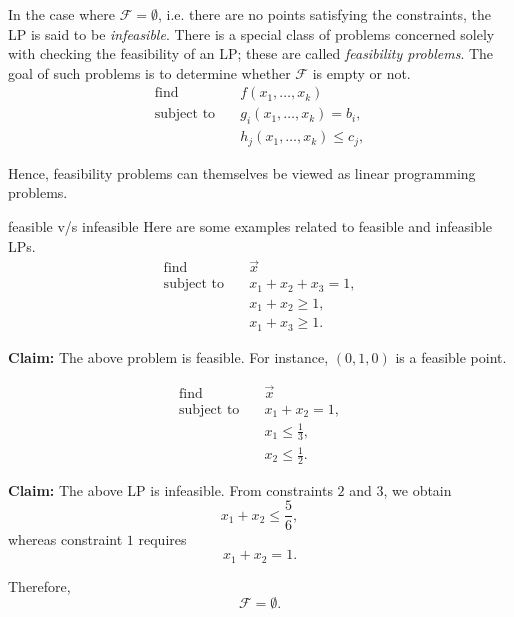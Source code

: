 In the case where $\mathcal{F} = \emptyset$, i.e. there are no points satisfying the constraints, the LP is said to be \textit{infeasible}.
There is a special class of problems concerned solely with checking the feasibility of an LP; these are called \textit{feasibility problems}. The goal of such problems is to determine whether $\mathcal{F}$ is empty or not.
\begin{align}
    \text{find} \quad & f(x_1,\dots,x_k)           \\
    \text{subject to} \quad
                      & g_i(x_1,\dots,x_k)=b_i,    \\
                      & h_j(x_1,\dots,x_k)\le c_j,
    \label{feasibility LPs}
\end{align}

Hence, feasibility problems can themselves be viewed as linear programming problems.

\begin{prf}{feasible v/s infeasible}
    Here are some examples related to feasible and infeasible LPs.
    \begin{align}
        \text{find} \quad & \vec{x}              \\
        \text{subject to} \quad
                          & x_1 + x_2 + x_3 = 1, \\
                          & x_1 + x_2 \ge 1,     \\
                          & x_1 + x_3 \ge 1.
    \end{align}

    \textbf{Claim:} The above problem is feasible. For instance, $(0,1,0)$ is a feasible point.

    \begin{align}
        \text{find} \quad & \vec{x}              \\
        \text{subject to} \quad
                          & x_1 + x_2 = 1,       \\
                          & x_1 \le \frac{1}{3}, \\
                          & x_2 \le \frac{1}{2}.
    \end{align}

    \textbf{Claim:} The above LP is infeasible. From constraints $2$ and $3$, we obtain
    \[
        x_1 + x_2 \le \frac{5}{6},
    \]
    whereas constraint $1$ requires
    \[
        x_1 + x_2 = 1.
    \]

    Therefore,
    \[
        \mathcal{F} = \emptyset.
    \]
\end{prf}

